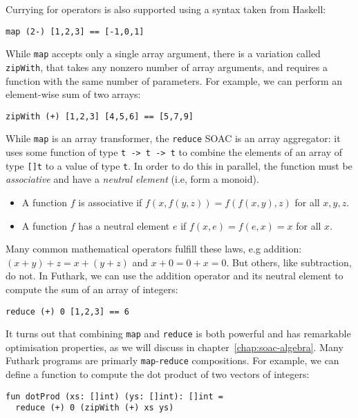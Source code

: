 \documentclass[11pt]{book}
\begin{document}
Currying for operators is also supported using a syntax taken from
Haskell:

\begin{lstlisting}
map (2-) [1,2,3] == [-1,0,1]
\end{lstlisting}

While \texttt{map} accepts only a single array argument, there is a
variation called \texttt{zipWith}, that takes any nonzero number of
array arguments, and requires a function with the same number of
parameters.  For example, we can perform an element-wise sum of two
arrays:

\begin{lstlisting}
zipWith (+) [1,2,3] [4,5,6] == [5,7,9]
\end{lstlisting}

While \texttt{map} is an array transformer, the \texttt{reduce} SOAC
is an array aggregator: it uses some function of type \texttt{t -> t
  -> t} to combine the elements of an array of type \texttt{[]t} to a
value of type \texttt{t}.  In order to do this in parallel, the
function must be \textit{associative} and have a \textit{neutral
  element} (i.e, form a monoid).

\begin{itemize}
\item A function $f$ is associative if $f(x,f(y,z)) = f(f(x,y),z)$ for
  all $x,y,z$.
\item A function $f$ has a neutral element $e$ if
  $f(x,e) = f(e,x) = x$ for all $x$.
\end{itemize}

Many common mathematical operators fulfill these laws, e.g addition:
$(x+y)+z=x+(y+z)$ and $x+0=0+x=0$.  But others, like subtraction, do
not.  In Futhark, we can use the addition operator and its neutral
element to compute the sum of an array of integers:

\begin{lstlisting}
reduce (+) 0 [1,2,3] == 6
\end{lstlisting}

It turns out that combining \texttt{map} and \texttt{reduce} is both
powerful and has remarkable optimisation properties, as we will
discuss in chapter~\ref{chap:soac-algebra}.  Many Futhark programs are
primarly \texttt{map}-\texttt{reduce} compositions.  For example, we
can define a function to compute the dot product of two vectors of
integers:

\begin{lstlisting}
fun dotProd (xs: []int) (ys: []int): []int =
  reduce (+) 0 (zipWith (+) xs ys)
\end{lstlisting}
\end{document}
